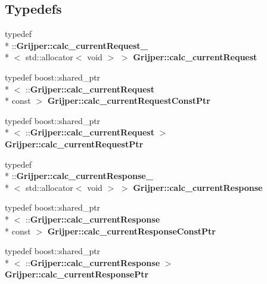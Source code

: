 \subsection*{Typedefs}
\begin{DoxyCompactItemize}
\item 
typedef \\*
\-::{\bf Grijper\-::calc\-\_\-current\-Request\-\_\-}\\*
$<$ std\-::allocator$<$ void $>$ $>$ {\bf Grijper\-::calc\-\_\-current\-Request}
\item 
typedef boost\-::shared\-\_\-ptr\\*
$<$ \-::{\bf Grijper\-::calc\-\_\-current\-Request} \\*
const  $>$ {\bf Grijper\-::calc\-\_\-current\-Request\-Const\-Ptr}
\item 
typedef boost\-::shared\-\_\-ptr\\*
$<$ \-::{\bf Grijper\-::calc\-\_\-current\-Request} $>$ {\bf Grijper\-::calc\-\_\-current\-Request\-Ptr}
\item 
typedef \\*
\-::{\bf Grijper\-::calc\-\_\-current\-Response\-\_\-}\\*
$<$ std\-::allocator$<$ void $>$ $>$ {\bf Grijper\-::calc\-\_\-current\-Response}
\item 
typedef boost\-::shared\-\_\-ptr\\*
$<$ \-::{\bf Grijper\-::calc\-\_\-current\-Response} \\*
const  $>$ {\bf Grijper\-::calc\-\_\-current\-Response\-Const\-Ptr}
\item 
typedef boost\-::shared\-\_\-ptr\\*
$<$ \-::{\bf Grijper\-::calc\-\_\-current\-Response} $>$ {\bf Grijper\-::calc\-\_\-current\-Response\-Ptr}
\end{DoxyCompactItemize}
